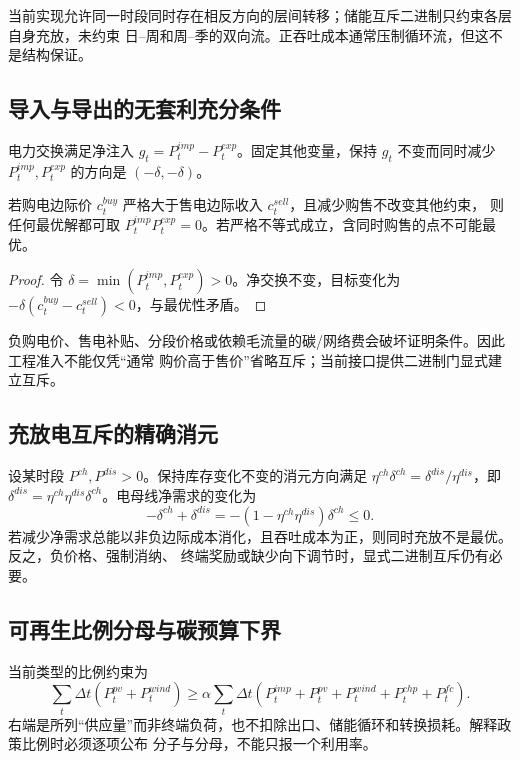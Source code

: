 \begin{gapnote}
当前实现允许同一时段同时存在相反方向的层间转移；储能互斥二进制只约束各层自身充放，未约束
日--周和周--季的双向流。正吞吐成本通常压制循环流，但这不是结构保证。
\end{gapnote}

\subsection{导入与导出的无套利充分条件}

电力交换满足净注入 $g_t=P_t^{imp}-P_t^{exp}$。固定其他变量，保持 $g_t$ 不变而同时减少
$P_t^{imp},P_t^{exp}$ 的方向是 $(-\delta,-\delta)$。

\begin{proposition}[价格次序排除同时购售]
若购电边际价 $c_t^{buy}$ 严格大于售电边际收入 $c_t^{sell}$，且减少购售不改变其他约束，
则任何最优解都可取 $P_t^{imp}P_t^{exp}=0$。若严格不等式成立，含同时购售的点不可能最优。
\end{proposition}
\begin{proof}
令 $\delta=\min(P_t^{imp},P_t^{exp})>0$。净交换不变，目标变化为
$-\delta(c_t^{buy}-c_t^{sell})<0$，与最优性矛盾。
\end{proof}

负购电价、售电补贴、分段价格或依赖毛流量的碳/网络费会破坏证明条件。因此工程准入不能仅凭“通常
购价高于售价”省略互斥；当前接口提供二进制门显式建立互斥。

\subsection{充放电互斥的精确消元}

设某时段 $P^{ch},P^{dis}>0$。保持库存变化不变的消元方向满足
$\eta^{ch}\delta^{ch}=\delta^{dis}/\eta^{dis}$，即
$\delta^{dis}=\eta^{ch}\eta^{dis}\delta^{ch}$。电母线净需求的变化为
\begin{equation}
 -\delta^{ch}+\delta^{dis}=-(1-\eta^{ch}\eta^{dis})\delta^{ch}\le0.
\end{equation}
若减少净需求总能以非负边际成本消化，且吞吐成本为正，则同时充放不是最优。反之，负价格、强制消纳、
终端奖励或缺少向下调节时，显式二进制互斥仍有必要。

\subsection{可再生比例分母与碳预算下界}

当前类型的比例约束为
\begin{equation}
 \sum_t\Delta t(P_t^{pv}+P_t^{wind})\ge \alpha
 \sum_t\Delta t(P_t^{imp}+P_t^{pv}+P_t^{wind}+P_t^{chp}+P_t^{fc}).
 \label{eq:ies-renewable-mandate}
\end{equation}
右端是所列“供应量”而非终端负荷，也不扣除出口、储能循环和转换损耗。解释政策比例时必须逐项公布
分子与分母，不能只报一个利用率。

